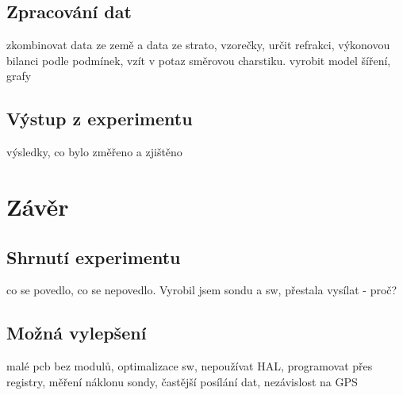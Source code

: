 \documentclass[twoside]{ctuthesis}
\theoremstyle{plain}
\theoremstyle{definition}
\theoremstyle{note}
\begin{document}
	\section{Zpracování dat}
	zkombinovat data ze země a data ze strato, vzorečky, určit refrakci, výkonovou bilanci podle podmínek, vzít v potaz směrovou charstiku. vyrobit model šíření, grafy

	\section{Výstup z experimentu}
	výsledky, co bylo změřeno a zjištěno



\chapter{Závěr}
	\section{Shrnutí experimentu}
	co se povedlo, co se nepovedlo. Vyrobil jsem sondu a sw, přestala vysílat - proč? 

	\section{Možná vylepšení}
	malé pcb bez modulů, optimalizace sw, nepoužívat HAL, programovat přes registry, měření náklonu sondy, častější posílání dat, nezávislost na GPS




\appendix

\printindex

\appendix




\end{document}
